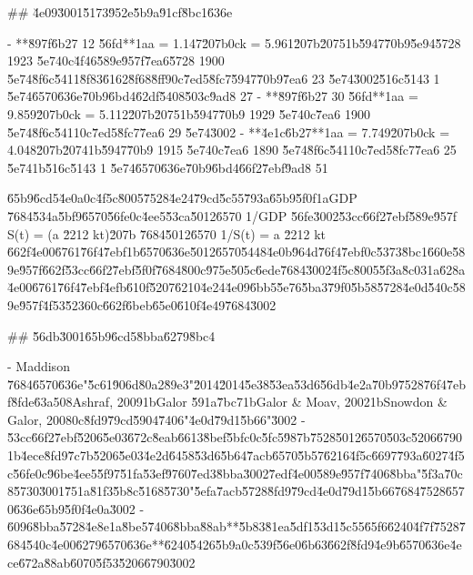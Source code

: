 \documentclass[10pt]{article}
\begin{document}
\begin{AnswerText}
## \u4e09\u3001\u5173\u952e\u5b9a\u91cf\u8bc1\u636e

- **\u897f\u6b27 12 \u56fd**\uff1aa = 1.147\u207b\uff0ck = 5.961\u207b\u2075\uff1b\u5947\u70b9\u5e94\u5728 1923 \u5e74\uff0c\u4f46\u589e\u957f\u7ea6\u5728 1900 \u5e74\u8f6c\u5411\u8f83\u6162\u8f68\u8ff9\uff0c\u7ed5\u8fc7\u5947\u70b9\u7ea6 23 \u5e74\u3002\u516c\u5143 1 \u5e74\u6570\u636e\u70b9\u6bd4\u62df\u5408\u503c\u9ad8 27%
- **\u897f\u6b27 30 \u56fd**\uff1aa = 9.859\u207b\uff0ck = 5.112\u207b\u2075\uff1b\u5947\u70b9 1929 \u5e74\uff0c\u7ea6 1900 \u5e74\u8f6c\u5411\uff0c\u7ed5\u8fc7\u7ea6 29 \u5e74\u3002
- **\u4e1c\u6b27**\uff1aa = 7.749\u207b\uff0ck = 4.048\u207b\u2074\uff1b\u5947\u70b9 1915 \u5e74\uff0c\u7ea6 1890 \u5e74\u8f6c\u5411\uff0c\u7ed5\u8fc7\u7ea6 25 \u5e74\uff1b\u516c\u5143 1 \u5e74\u6570\u636e\u70b9\u6bd4\u66f2\u7ebf\u9ad8 51%

\u65b9\u6cd5\u4e0a\uff0c\u4f5c\u8005\u7528\u4e24\u79cd\u5c55\u793a\u65b9\u5f0f\uff1aGDP \u7684\u534a\u5bf9\u6570\u56fe\uff0c\u4ee5\u53ca\u5012\u6570 1/GDP \u56fe\u3002\u53cc\u66f2\u7ebf\u589e\u957f S(t) = (a \u2212 kt)\u207b \u7684\u5012\u6570 1/S(t) = a \u2212 kt \u662f\u4e00\u6761\u76f4\u7ebf\uff1b\u6570\u636e\u5012\u6570\u5448\u4e0b\u964d\u76f4\u7ebf\uff0c\u5373\u8bc1\u660e\u589e\u957f\u662f\u53cc\u66f2\u7ebf\u5f0f\u7684\u800c\u975e\u505c\u6ede\u7684\u3002\u4f5c\u8005\u5f3a\u8c03\uff1a\u628a\u4e00\u6761\u76f4\u7ebf\u4efb\u610f\u5207\u6210\u4e24\u4e09\u6bb5\u5e76\u5ba3\u79f0\u5b58\u5728\u4e0d\u540c\u589e\u957f\u4f53\u5236\uff0c\u662f\u6beb\u65e0\u610f\u4e49\u7684\u3002

## \u56db\u3001\u65b9\u6cd5\u8bba\u6279\u8bc4

- Maddison \u7684\u6570\u636e"\u5c61\u906d\u80a2\u89e3"\u2014\u2014\u5e38\u53ea\u53d6\u56db\u4e2a\u70b9\u7528\u76f4\u7ebf\u8fde\u63a5\uff08Ashraf, 2009\uff1bGalor \u591a\u7bc7\uff1bGalor & Moav, 2002\uff1bSnowdon & Galor, 2008\uff0c\u8fd9\u79cd\u5904\u7406"\u4e0d\u79d1\u5b66"\u3002
- \u53cc\u66f2\u7ebf\u5206\u5e03\u672c\u8eab\u6613\u8bef\u5bfc\uff0c\u5fc5\u987b\u7528\u5012\u6570\u503c\u5206\u6790\uff1b\u4ece\u8fd9\u7c7b\u5206\u5e03\u4e2d\u6458\u53d6\u5b64\u7acb\u6570\u5b57\u6216\u4f5c\u6697\u793a\u6027\u4f5c\u56fe\uff0c\u96be\u4ee5\u5f97\u51fa\u53ef\u9760\u7ed3\u8bba\u3002\u7edf\u4e00\u589e\u957f\u7406\u8bba"\u5f3a\u70c8\u5730\u3001\u751a\u81f3\u5b8c\u5168\u5730"\u5efa\u7acb\u5728\u8fd9\u79cd\u4e0d\u79d1\u5b66\u7684\u7528\u6570\u636e\u65b9\u5f0f\u4e0a\u3002
- \u6096\u8bba\u5728\u4e8e\uff1a\u8be5\u7406\u8bba\u88ab**\u5b83\u81ea\u5df1\u53d1\u5c55\u65f6\u6240\u4f7f\u7528\u7684\u540c\u4e00\u6279\u6570\u636e**\u6240\u5426\u5b9a\uff0c\u539f\u56e0\u6b63\u662f\u8fd9\u4e9b\u6570\u636e\u4ece\u672a\u88ab\u6070\u5f53\u5206\u6790\u3002


\end{AnswerText}
\end{document}
